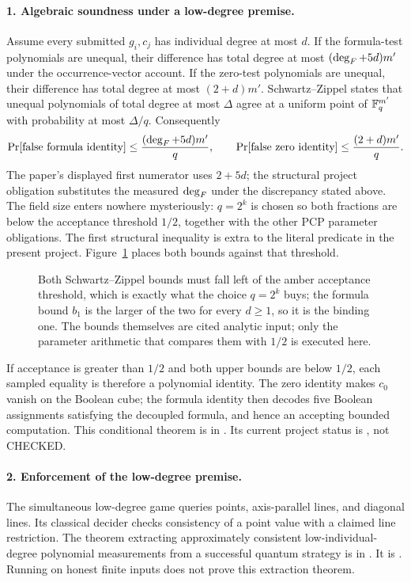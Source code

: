 \paragraph{1. Algebraic soundness under a low-degree premise.}
Assume every submitted \(g_i,c_j\) has individual degree at most \(d\).  If the
formula-test polynomials are unequal, their difference has total degree at most
\((\operatorname{deg}_F+5d)m'\) under the occurrence-vector account.  If the zero-test
polynomials are unequal, their difference has total degree at most
\((2+d)m'\).  Schwartz--Zippel states that unequal polynomials of total degree
at most \(\Delta\) agree at a uniform point of \(\mathbb F_q^{m'}\) with probability
at most \(\Delta/q\).
Consequently
\[
 \Pr[\text{false formula identity}]
 \leq \frac{(\operatorname{deg}_F+5d)m'}{q},\qquad
 \Pr[\text{false zero identity}]
 \leq \frac{(2+d)m'}{q}.
\]
The paper's displayed first numerator uses \(2+5d\); the structural project
obligation substitutes the measured \(\operatorname{deg}_F\) under the discrepancy stated
above.  The field size enters nowhere mysteriously: \(q=2^k\) is chosen so
both fractions are below the acceptance threshold \(1/2\), together with the
other PCP parameter obligations.  The first structural inequality is extra to
the literal  predicate in the present project.
Figure~\ref{fig:D-threshold-margin} places both bounds against that
threshold.
\begin{figure}[H]
\centering

\caption{Both Schwartz--Zippel bounds must fall left of the amber acceptance threshold, which is exactly what the choice \(q=2^k\) buys; the formula bound \(b_1\) is the larger of the two for every \(d\geq1\), so it is the binding one.  The bounds themselves are cited analytic input; only the parameter arithmetic that compares them with \(1/2\) is executed here.}
\label{fig:D-threshold-margin}
\end{figure}

If acceptance is greater than \(1/2\) and both upper bounds are below
\(1/2\), each sampled equality is therefore a polynomial identity.  The zero
identity makes \(c_0\) vanish on the Boolean cube; the formula identity then
decodes five Boolean assignments satisfying the decoupled formula, and hence an
accepting bounded computation.  This conditional theorem is
 in
.  Its current project status is
, not CHECKED.

\paragraph{2. Enforcement of the low-degree premise.}
The simultaneous low-degree game queries points, axis-parallel lines, and
diagonal lines.  Its classical decider checks consistency of a point value with
a claimed line restriction.
The theorem extracting approximately consistent low-individual-degree
polynomial measurements from a successful quantum strategy is
 in .  It is
.  Running  on honest finite inputs does not prove
this extraction theorem.

